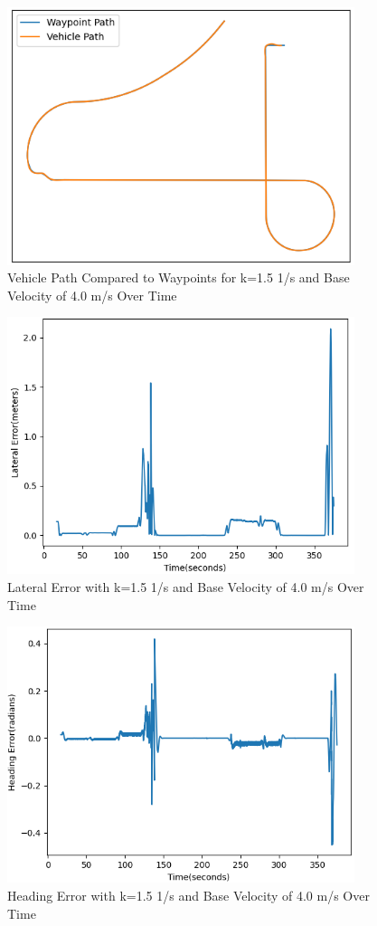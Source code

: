 \documentclass[titlepage]{article}
\begin{document}
{\begin{figure}
	\centering
	\includegraphics[width=4in]{waypoints_k-15_v-4}
	\caption{Vehicle Path Compared to Waypoints for k=1.5 1/s and Base Velocity of 4.0 m/s Over Time}
	\label{fig:waypointsk10v4}
\end{figure}

\begin{figure}
	\centering
	\includegraphics[width=4in]{lateral_k-15_v-4}
	\caption{Lateral Error with k=1.5 1/s and Base Velocity of 4.0 m/s Over Time}
	\label{fig:lateralk10v4}
\end{figure}

\begin{figure}
	\centering
	\includegraphics[width=4in]{heading_k-15_v-4}
	\caption{Heading Error with k=1.5 1/s and Base Velocity of 4.0 m/s Over Time}
	\label{fig:headingk10v4}
\end{figure}

}
\end{document}
